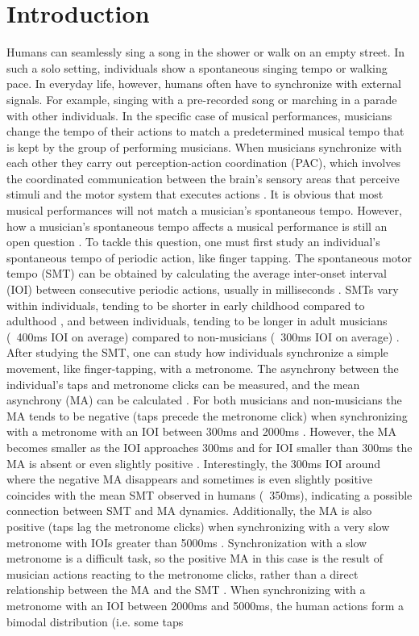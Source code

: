 \documentclass{report}
\begin{document}
\section{Introduction}
Humans can seamlessly sing a song in the shower or walk on an empty street. In such a solo setting, individuals show a spontaneous singing tempo or walking pace. In everyday life, however, humans often have to synchronize with external signals. For example, singing with a pre-recorded song or marching in a parade with other individuals. In the specific case of musical performances, musicians change the tempo of their actions to match a predetermined musical tempo that is kept by the group of performing musicians. When musicians synchronize with each other they carry out perception-action coordination (PAC), which involves the coordinated communication between the brain's sensory areas that perceive stimuli and the motor system that executes actions \cite{ridderinkhof2014neurocognitive}. It is obvious that most musical performances will not match a musician's spontaneous tempo. However, how a musician's spontaneous tempo affects a musical performance is still an open question \cite{zamm2018musicians}. To tackle this question, one must first study an individual's spontaneous tempo of periodic action, like finger tapping. The spontaneous motor tempo (SMT) can be obtained by calculating the average inter-onset interval (IOI) between consecutive periodic actions, usually in milliseconds \cite{mcauley2006time}. SMTs vary within individuals, tending to be shorter in early childhood compared to adulthood \cite{mcauley2006time}, and between individuals, tending to be longer in adult musicians (~400ms IOI on average) compared to non-musicians (~300ms IOI on average) \cite{scheurich2016spontaneous, drake2000tapping}. After studying the SMT, one can study how individuals synchronize a simple movement, like finger-tapping, with a metronome. The asynchrony between the individual's taps and metronome clicks can be measured, and the mean asynchrony (MA) can be calculated \cite{repp2005sensorimotor, repp2013sensorimotor}. For both musicians and non-musicians the MA tends to be negative (taps precede the metronome click) when synchronizing with a metronome with an IOI between 300ms and 2000ms \cite{mates1994temporal}. However, the MA becomes smaller as the IOI approaches 300ms and for IOI smaller than 300ms the MA is absent or even slightly positive \cite{repp2003rate, wohlschlager1999synchronization}. Interestingly, the 300ms IOI around where the negative MA disappears and sometimes is even slightly positive coincides with the mean SMT observed in humans (~350ms), indicating a possible connection between SMT and MA dynamics. Additionally, the MA is also positive (taps lag the metronome clicks) when synchronizing with a very slow metronome with IOIs greater than 5000ms \cite{miyake2004two}. Synchronization with a slow metronome is a difficult task, so the positive MA in this case is the result of musician actions reacting to the metronome clicks, rather than a direct relationship between the MA and the SMT \cite{repp2007tapping}. When synchronizing with a metronome with an IOI between 2000ms and 5000ms, the human actions form a bimodal distribution (i.e. some taps 
\end{document}
